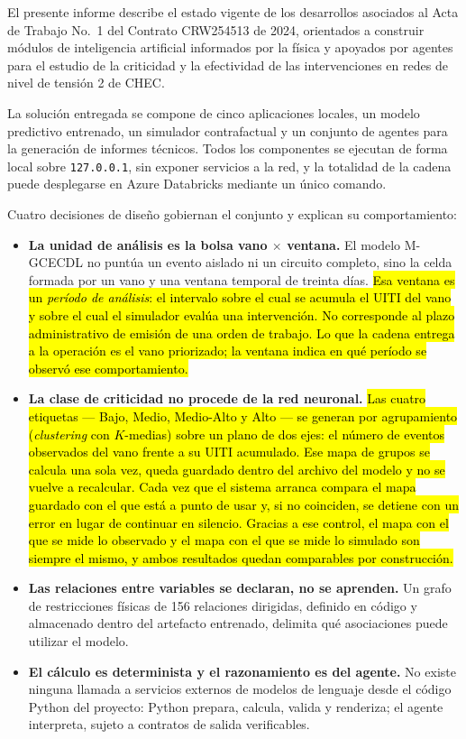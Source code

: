 \documentclass[11pt,a4paper]{article}
\newcommand{\nv}[1]{\hl{#1}}
\begin{document}
El presente informe describe el estado vigente de los desarrollos asociados al Acta de
Trabajo No.~1 del Contrato CRW254513 de 2024, orientados a construir módulos de inteligencia
artificial informados por la física y apoyados por agentes para el estudio de la criticidad y
la efectividad de las intervenciones en redes de nivel de tensión 2 de CHEC.

La solución entregada se compone de cinco aplicaciones locales, un modelo predictivo
entrenado, un simulador contrafactual y un conjunto de agentes para la generación de
informes técnicos. Todos los componentes se ejecutan de forma local sobre
\texttt{127.0.0.1}, sin exponer servicios a la red, y la totalidad de la cadena puede
desplegarse en Azure Databricks mediante un único comando.

Cuatro decisiones de diseño gobiernan el conjunto y explican su comportamiento:

\begin{itemize}
  \item \textbf{La unidad de análisis es la bolsa vano $\times$ ventana.} El modelo
        M-GCECDL no puntúa un evento aislado ni un circuito completo, sino la celda
        formada por un vano y una ventana temporal de treinta días.
        \nv{Esa ventana es un \emph{período de análisis}: el intervalo sobre el cual se
        acumula el UITI del vano y sobre el cual el simulador evalúa una intervención. No
        corresponde al plazo administrativo de emisión de una orden de trabajo. Lo que la
        cadena entrega a la operación es el vano priorizado; la ventana indica en qué
        período se observó ese comportamiento.}
  \item \textbf{La clase de criticidad no procede de la red neuronal.}
        \nv{Las cuatro etiquetas --- Bajo, Medio, Medio-Alto y Alto --- se generan por
        agrupamiento (\emph{clustering} con \mbox{$K$-medias}) sobre un plano de dos ejes:
        el número de eventos observados del vano frente a su UITI acumulado. Ese mapa de
        grupos se calcula una sola vez, queda guardado dentro del archivo del modelo y no
        se vuelve a recalcular. Cada vez que el sistema arranca compara el mapa guardado
        con el que está a punto de usar y, si no coinciden, se detiene con un error en
        lugar de continuar en silencio. Gracias a ese control, el mapa con el que se mide
        lo observado y el mapa con el que se mide lo simulado son siempre el mismo, y
        ambos resultados quedan comparables por construcción.}
  \item \textbf{Las relaciones entre variables se declaran, no se aprenden.} Un grafo de
        restricciones físicas de 156 relaciones dirigidas, definido en código y almacenado
        dentro del artefacto entrenado, delimita qué asociaciones puede utilizar el modelo.
  \item \textbf{El cálculo es determinista y el razonamiento es del agente.} No existe
        ninguna llamada a servicios externos de modelos de lenguaje desde el código Python
        del proyecto: Python prepara, calcula, valida y renderiza; el agente interpreta,
        sujeto a contratos de salida verificables.
\end{itemize}
\end{document}

